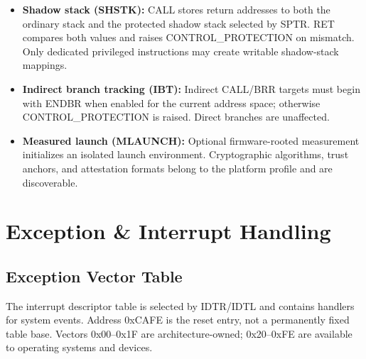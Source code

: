 \documentclass[11pt]{article}
\begin{document}
\begin{itemize}
    \item \textbf{Shadow stack (SHSTK):} CALL stores return addresses to both the ordinary stack and the protected shadow stack selected by SPTR. RET compares both values and raises CONTROL\_PROTECTION on mismatch. Only dedicated privileged instructions may create writable shadow-stack mappings.
    \item \textbf{Indirect branch tracking (IBT):} Indirect CALL/BRR targets must begin with ENDBR when enabled for the current address space; otherwise CONTROL\_PROTECTION is raised. Direct branches are unaffected.
    \item \textbf{Measured launch (MLAUNCH):} Optional firmware-rooted measurement initializes an isolated launch environment. Cryptographic algorithms, trust anchors, and attestation formats belong to the platform profile and are discoverable.
\end{itemize}

\section{Exception \& Interrupt Handling}

\subsection{Exception Vector Table}

The interrupt descriptor table is selected by IDTR/IDTL and contains handlers for system events. Address 0xCAFE is the reset entry, not a permanently fixed table base. Vectors 0x00--0x1F are architecture-owned; 0x20--0xFE are available to operating systems and devices.
\end{document}
